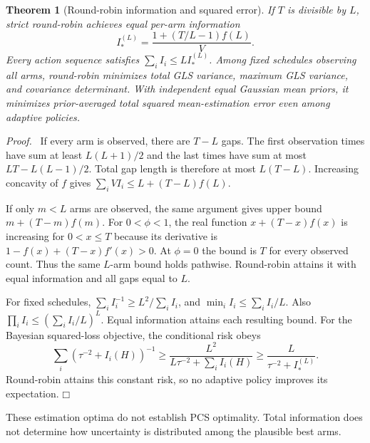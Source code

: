 \documentclass[11pt]{article}
\newtheorem{theorem}{Theorem}
\newenvironment{proof}{\par\noindent\textit{Proof.}\ }{\hfill$\mdlgwhtsquare$\par\medskip}
\begin{document}
\begin{theorem}[Round-robin information and squared error]
If $T$ is divisible by $L$, strict round-robin achieves equal per-arm information
\begin{equation}
I_*^{(L)}=\frac{1+(T/L-1)f(L)}V.
\end{equation}
Every action sequence satisfies $\sum_iI_i\leq L I_*^{(L)}$. Among fixed schedules observing all arms, round-robin minimizes total GLS variance, maximum GLS variance, and covariance determinant. With independent equal Gaussian mean priors, it minimizes prior-averaged total squared mean-estimation error even among adaptive policies.
\end{theorem}
\begin{proof}
If every arm is observed, there are $T-L$ gaps. The first observation times have sum at least $L(L+1)/2$ and the last times have sum at most $LT-L(L-1)/2$. Total gap length is therefore at most $L(T-L)$. Increasing concavity of $f$ gives $\sum_iVI_i\leq L+(T-L)f(L)$.

If only $m<L$ arms are observed, the same argument gives upper bound $m+(T-m)f(m)$. For $0<\phi<1$, the real function $x+(T-x)f(x)$ is increasing for $0<x\leq T$ because its derivative is $1-f(x)+(T-x)f'(x)>0$. At $\phi=0$ the bound is $T$ for every observed count. Thus the same $L$-arm bound holds pathwise. Round-robin attains it with equal information and all gaps equal to $L$.

For fixed schedules, $\sum_iI_i^{-1}\geq L^2/\sum_iI_i$, and $\min_iI_i\leq\sum_iI_i/L$. Also $\prod_iI_i\leq(\sum_iI_i/L)^L$. Equal information attains each resulting bound. For the Bayesian squared-loss objective, the conditional risk obeys
\[
\sum_i(\tau^{-2}+I_i(H))^{-1}
\geq\frac{L^2}{L\tau^{-2}+\sum_iI_i(H)}
\geq\frac L{\tau^{-2}+I_*^{(L)}}.
\]
Round-robin attains this constant risk, so no adaptive policy improves its expectation.
\end{proof}
These estimation optima do not establish PCS optimality. Total information does not determine how uncertainty is distributed among the plausible best arms.
\end{document}
